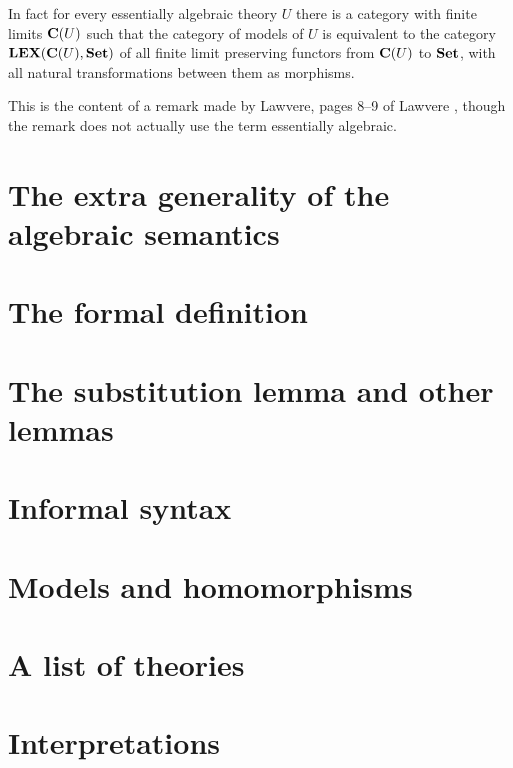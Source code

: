 In fact for every essentially algebraic theory $U$ there is a category with finite limits $\mathbf{C}(U)$ such that the category of models of $U$ is equivalent to the category $\mathbf{LEX}(\mathbf{C}(U),\mathbf{Set})$ of all finite limit preserving functors from $\mathbf{C}(U)$ to $\mathbf{Set}$, with all natural transformations between them as morphisms.

This is the content of a remark made by Lawvere, pages 8--9 of Lawvere \cite{lawvere:17}, though the remark does not actually use the term essentially algebraic.

\section{The extra generality of the algebraic semantics} \label{sec:source-1-5}

\lipsum[4]

\section{The formal definition} \label{sec:source-1-6}

\lipsum[5]

\section{The substitution lemma and other lemmas} \label{sec:source-1-7}

\lipsum[6]

\section{Informal syntax} \label{sec:source-1-8}

\lipsum[7]

\section{Models and homomorphisms} \label{sec:source-1-9}

\lipsum[8]

\section{A list of theories} \label{sec:source-1-10}

\lipsum[9]

\section{Interpretations} \label{sec:source-1-11}

